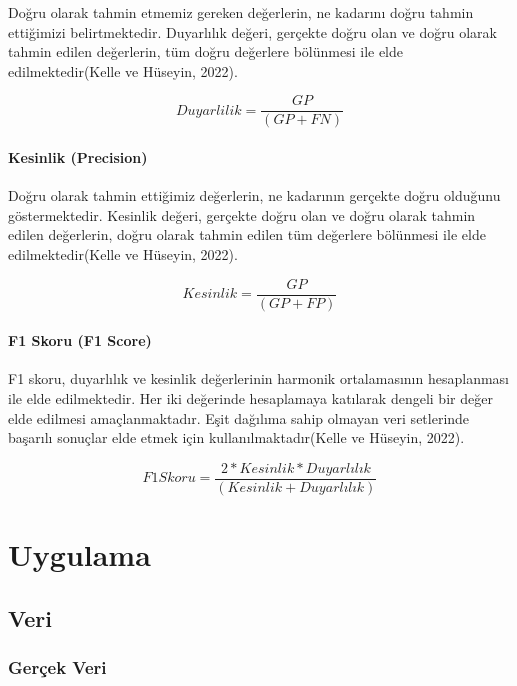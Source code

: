\documentclass[12pt,twoside]{deuthesis}
\begin{document}
Doğru olarak tahmin etmemiz gereken değerlerin, ne kadarını doğru tahmin ettiğimizi belirtmektedir. Duyarlılık değeri, gerçekte doğru olan ve doğru olarak tahmin edilen değerlerin, tüm doğru değerlere bölünmesi ile elde edilmektedir(Kelle ve Hüseyin, 2022).

\[Duyarlilik =  \frac{GP}{(GP + FN)}\]

\hypertarget{kesinlik-precision}{%
\subsubsection{Kesinlik (Precision)}\label{kesinlik-precision}}

Doğru olarak tahmin ettiğimiz değerlerin, ne kadarının gerçekte doğru olduğunu göstermektedir. Kesinlik değeri, gerçekte doğru olan ve doğru olarak tahmin edilen değerlerin, doğru olarak tahmin edilen tüm değerlere bölünmesi ile elde edilmektedir(Kelle ve Hüseyin, 2022).

\[Kesinlik =  \frac{GP}{(GP + FP)}\]

\hypertarget{f1-skoru-f1-score}{%
\subsubsection{F1 Skoru (F1 Score)}\label{f1-skoru-f1-score}}

F1 skoru, duyarlılık ve kesinlik değerlerinin harmonik ortalamasının hesaplanması ile elde edilmektedir. Her iki değerinde hesaplamaya katılarak dengeli bir değer elde edilmesi amaçlanmaktadır. Eşit dağılıma sahip olmayan veri setlerinde başarılı sonuçlar elde etmek için kullanılmaktadır(Kelle ve Hüseyin, 2022).

\[ F1 Skoru = \frac{2 * Kesinlik * Duyarlılık}{(Kesinlik + Duyarlılık)} \]

\hypertarget{Bolum3}{%
\chapter{Uygulama}\label{Bolum3}}

\hypertarget{veri}{%
\section{Veri}\label{veri}}

\hypertarget{geruxe7ek-veri}{%
\subsection{Gerçek Veri}\label{geruxe7ek-veri}}
\end{document}
